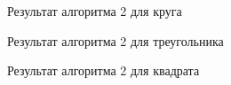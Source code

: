 \documentclass[a4paper, 12pt]{article}
\begin{document}
\begin{figure}[h!]
  \caption{Результат алгоритма 2 для круга}
  \label{s1}
\end{figure}
\begin{figure}[h!]
  \caption{Результат алгоритма 2 для треугольника}
  \label{s2}
\end{figure}
\begin{figure}[h!]
  \caption{Результат алгоритма 2 для квадрата}
  \label{s3}
\end{figure}
\end{document}
